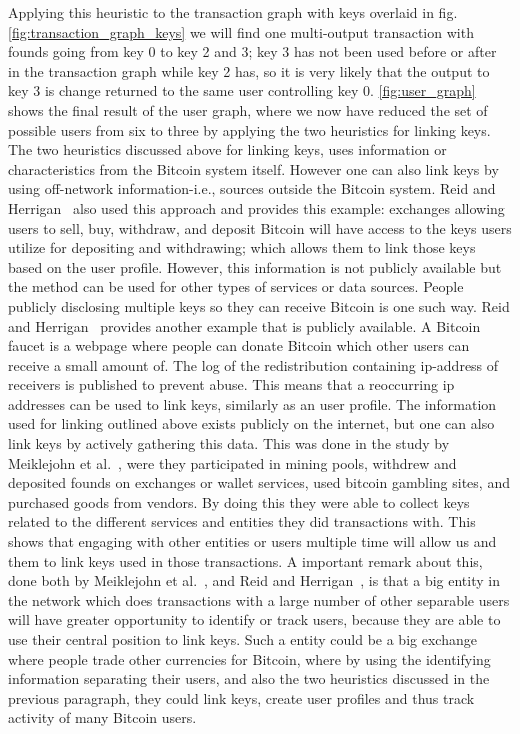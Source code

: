 Applying this heuristic to the transaction graph with keys overlaid in fig.\ref{fig:transaction_graph_keys} we will find one multi-output transaction with founds going from key 0 to key 2 and 3; key 3 has not been used before or after in the transaction graph while key 2 has, so it is very likely that the output to key 3 is change returned to the same user controlling key 0. \cref{fig:user_graph} shows the final result of the user graph, where we now have reduced the set of possible users from six to three by applying the two heuristics for linking keys.
\\

The two heuristics discussed above for linking keys, uses information or characteristics from the Bitcoin system itself. However one can also link keys by using off-network information-i.e., sources outside the Bitcoin system.
Reid and Herrigan~\cite{reid2013analysis} also used this approach and provides this example: exchanges allowing users to sell, buy, withdraw, and deposit Bitcoin will have access to the keys users utilize for depositing and withdrawing; which allows them to link those keys based on the user profile. However, this information is not publicly available but the method can be used for other types of services or data sources. People publicly disclosing multiple keys so they can receive Bitcoin is one such way. Reid and Herrigan~\cite{reid2013analysis} provides another example that is publicly available. A Bitcoin faucet is a webpage where people can donate Bitcoin which other users can receive a small amount of. The log of the redistribution containing ip-address of receivers is published to prevent abuse. This means that a reoccurring ip addresses can be used to link keys, similarly as an user profile. The information used for linking outlined above exists publicly on the internet, but one can also link keys by actively gathering this data. This was done in the study by Meiklejohn et al.~\cite{meiklejohn2013fistful}, were they participated in mining pools, withdrew and deposited founds on exchanges or wallet services, used bitcoin gambling sites, and purchased goods from vendors. By doing this they were able to collect keys related to the different services and entities they did transactions with. 
This shows that engaging with other entities or users multiple time will allow us and them to link keys used in those transactions.
A important remark about this, done both by Meiklejohn et al.~\cite{meiklejohn2013fistful}, and Reid and Herrigan~\cite{reid2013analysis}, is that a big entity in the network which does transactions with a large number of other separable users will have greater opportunity to identify or track users, because they are able to use their central position to link keys. Such a entity could be a big exchange where people trade other currencies for Bitcoin, where by using the identifying information separating their users, and also the two heuristics discussed in the previous paragraph, they could link keys, create user profiles and thus track activity of many Bitcoin users.
\\

